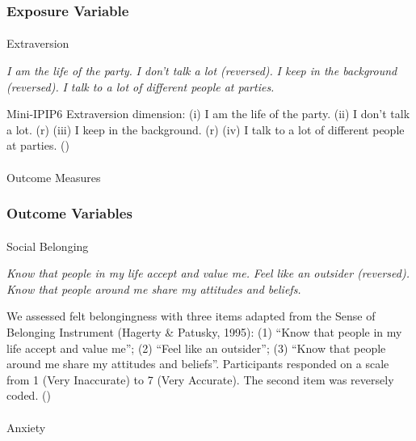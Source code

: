 \documentclass[
  single column]{article}
\makeatletter
\let\oldparagraph\paragraph
\renewcommand{\paragraph}{
    \@ifstar
      \xxxParagraphStar
      \xxxParagraphNoStar
  }
\newcommand{\xxxParagraphStar}[1]{\oldparagraph*{#1}\mbox{}}
\newcommand{\xxxParagraphNoStar}[1]{\oldparagraph{#1}\mbox{}}
\makeatother
\begin{document}
\subsubsection{Exposure Variable}\label{exposure-variable}

\paragraph{Extraversion}\label{extraversion}

\emph{I am the life of the party.} \emph{I don't talk a lot (reversed).}
\emph{I keep in the background (reversed).} \emph{I talk to a lot of
different people at parties.}

Mini-IPIP6 Extraversion dimension: (i) I am the life of the party. (ii)
I don't talk a lot. (r) (iii) I keep in the background. (r) (iv) I talk
to a lot of different people at parties.
()

\paragraph{Outcome Measures}\label{outcome-measures}

\subsubsection{Outcome Variables}\label{outcome-variables}

\paragraph{Social Belonging}\label{social-belonging-1}

\emph{Know that people in my life accept and value me.} \emph{Feel like
an outsider (reversed).} \emph{Know that people around me share my
attitudes and beliefs.}

We assessed felt belongingness with three items adapted from the Sense
of Belonging Instrument (Hagerty \& Patusky, 1995): (1) ``Know that
people in my life accept and value me''; (2) ``Feel like an outsider'';
(3) ``Know that people around me share my attitudes and beliefs''.
Participants responded on a scale from 1 (Very Inaccurate) to 7 (Very
Accurate). The second item was reversely coded.
()

\paragraph{Anxiety}\label{anxiety}
\end{document}
